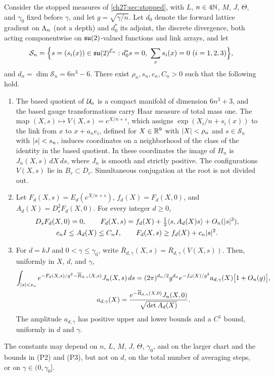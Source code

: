 \begin{theorem}\label{ch27:thm:central-stiff-chart}
Consider the stopped measures of \cref{ch27:sec:stopped}, with $L$, $n\in4\mathbb N$, $M$, $J$, $\Theta$, and $\gamma_0$ fixed before $\gamma$, and let $g=\sqrt{\gamma/n}$. Let $d_0$ denote the forward lattice gradient on $\Lambda_{n}$ (not a depth) and $d_0^*$ its adjoint, the discrete divergence, both acting componentwise on $\mathfrak{su}(2)$-valued functions and link arrays, and let
\[
 \mathcal S_n=\Bigl\{s=(s_i(x))\in\su^{\Links n}:d_0^*s=0,\ \sum_xs_i(x)=0\ (i=1,2,3)\Bigr\},
\]
and $d_n=\dim\mathcal S_n=6n^3-6$. There exist $\rho_n,s_n,c_n,C_n>0$ such that the following hold.
\begin{enumerate}
\item The based quotient of $\mathcal U_{n}$ is a compact manifold of dimension $6n^3+3$, and the based gauge transformations carry Haar measure of total mass one. The map $(X,s)\mapsto V(X,s)=e^{X/n+s}$, which assigns $\exp(X_i/n+s_i(x))$ to the link from $x$ to $x+a_ne_i$, defined for $X\in\mathbb R^9$ with $\lvert X\rvert<\rho_n$ and $s\in\mathcal S_n$ with $\lvert s\rvert<s_n$, induces coordinates on a neighborhood of the class of the identity in the based quotient. In these coordinates the image of $H_n$ is $J_n(X,s)\,dX\,ds$, where $J_n$ is smooth and strictly positive. The configurations $V(X,s)$ lie in $B_r\subset D_r$. Simultaneous conjugation at the root is not divided out.
\item Let $F_d(X,s)=E_d(e^{X/n+s})$, $f_d(X)=F_d(X,0)$, and $A_d(X)=D_s^2F_d(X,0)$. For every integer $d\ge0$,
\begin{gather*}
 D_sF_d(X,0)=0,\qquad F_d(X,s)=f_d(X)+\tfrac12\langle s,A_d(X)s\rangle+O_n(\lvert s\rvert^3),\\
 c_nI\le A_d(X)\le C_nI,\qquad F_d(X,s)\ge f_d(X)+c_n\lvert s\rvert^2.
\end{gather*}
\item For $d=kJ$ and $0<\gamma\le\gamma_0$, write $\overline R_{d,\gamma}(X,s)=\overline R_{d,\gamma}(V(X,s))$. Then, uniformly in $X$, $d$, and $\gamma$,
\begin{gather*}
 \int_{\lvert s\rvert<s_n}e^{-F_d(X,s)/g^2-\overline R_{d,\gamma}(X,s)}J_n(X,s)\,ds=(2\pi)^{d_n/2}g^{d_n}e^{-f_d(X)/g^2}a_{d,\gamma}(X)\bigl[1+O_n(g)\bigr],\\
 a_{d,\gamma}(X)=\frac{e^{-\overline R_{d,\gamma}(X,0)}J_n(X,0)}{\sqrt{\det A_d(X)}}.
\end{gather*}
The amplitude $a_{d,\gamma}$ has positive upper and lower bounds and a $C^1$ bound, uniformly in $d$ and $\gamma$.
\end{enumerate}
The constants may depend on $n$, $L$, $M$, $J$, $\Theta$, $\gamma_0$, and on the larger chart and the bounds in (P2) and (P3), but not on $d$, on the total number of averaging steps, or on $\gamma\in(0,\gamma_0]$.
\end{theorem}

